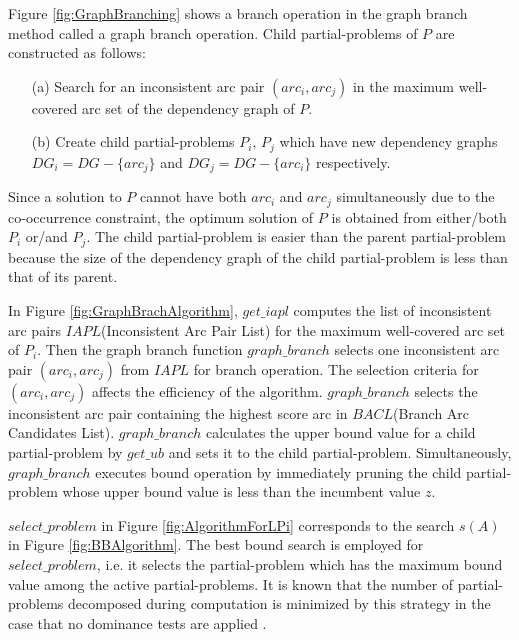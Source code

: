 Figure \ref{fig:GraphBranching} shows a branch operation in the graph branch
method called a graph branch operation. Child partial-problems of
$P$ are constructed as follows:

\begin{itemize}
\item[(a)] Search for an inconsistent arc pair $(arc_i,arc_j)$ in the maximum
well-covered arc set of the dependency graph of $P$.
\item[(b)] Create child partial-problems $P_i$, $P_j$ which have new
dependency graphs $DG_i=DG-\{arc_j\}$ and $DG_j=DG-\{arc_i\}$ respectively.
\end{itemize}

{\mynoindent}Since a solution to $P$ cannot have both $arc_i$ and
$arc_j$ simultaneously due to the co-occurrence constraint, the
optimum solution of $P$ is obtained from either/both $P_i$ or/and
$P_j$. The child partial-problem is easier than the parent
partial-problem because the size of the dependency graph of the child
partial-problem is less than that of its parent.

In Figure \ref{fig:GraphBrachAlgorithm}, $get\_iapl$ computes the list
of inconsistent arc pairs $IAPL$(Inconsistent Arc Pair List) for the
maximum well-covered arc set of $P_i$. Then the graph branch function
$graph\_branch$ selects one inconsistent arc pair $(arc_i,arc_j)$ from
$IAPL$ for branch operation. The selection criteria for
$(arc_i,arc_j)$ affects the efficiency of the
algorithm. $graph\_branch$ selects the inconsistent arc pair
containing the highest score arc in $BACL$(Branch Arc Candidates
List). $graph\_branch$ calculates the upper bound value for a child
partial-problem by $get\_ub$ and sets it to the child
partial-problem. Simultaneously, $graph\_branch$ executes bound
operation by immediately pruning the child partial-problem whose upper
bound value is less than the incumbent value $z$.

\mygapskip{}

$select\_problem$ in Figure \ref{fig:AlgorithmForLPi} corresponds to
the search $s(A)$ in Figure \ref{fig:BBAlgorithm}. The best bound
search is employed for $select\_problem$, i.e. it selects the
partial-problem which has the maximum bound value among the active
partial-problems. It is known that the number of partial-problems
decomposed during computation is minimized by this strategy in the case
that no dominance tests are applied \cite{Ibaraki78}.

